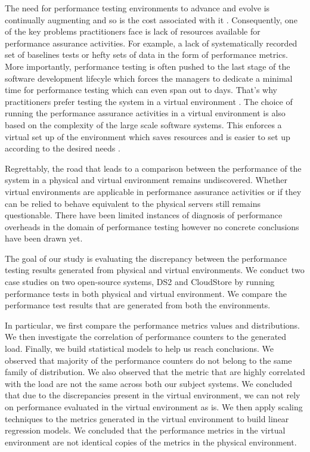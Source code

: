 The need for performance testing environments to advance and evolve is continually augmenting and so is the cost associated with it \cite{stpmag} \cite{bertolino2007software}. Consequently, one of the key problems practitioners face is lack of resources available for performance assurance activities\cite{5306331}. For example, a lack of systematically recorded set of baselines tests or hefty sets of data in the form of performance metrics. More importantly, performance testing is often pushed to the last stage of the software development lifecyle which forces the managers to dedicate a minimal time for performance testing which can even span out to days. That's why practitioners prefer testing the system in a virtual environment \cite{whyvirtualisbetter}\cite{vmwarehighcost}. The choice of running the performance assurance activities in a virtual environment is also based on the complexity of the large scale software systems. This enforces a virtual set up of the environment which saves resources and is easier to set up according to the desired needs \cite{VMWarePowerCLIBlog}\cite{seetharaman2006test}. 

Regrettably, the road that leads to a comparison between the performance of the system in a physical and virtual environment remains undiscovered. Whether virtual environments are applicable in performance assurance activities or if they can be relied to behave equivalent to the physical servers still remains questionable. There have been limited instances of diagnosis of performance overheads \cite{menon2005diagnosing} in the domain of performance testing however no concrete conclusions have been drawn yet. 

The goal of our study is evaluating the discrepancy between the performance testing results generated from physical and virtual environments. 
We conduct two case studies on two open-source systems, DS2\cite{delldvd} and CloudStore \cite{cloudstore} by running performance tests in both physical and virtual environment. We compare the performance test results that are generated from both the environments.

In particular, we first compare the performance metrics values and distributions. We then investigate the correlation of performance counters to the generated load. Finally, we build statistical models to help us reach conclusions. 
We observed that majority of the performance counters do not belong to the same family of distribution. We also observed that the metric that are highly correlated with the load are not the same across both our subject systems.
We concluded that due to the discrepancies present in the virtual environment, we can not rely on performance evaluated in the virtual environment as is. We then apply scaling techniques to the metrics generated in the virtual environment to build linear regression models. We concluded that the performance metrics in the virtual environment are not identical copies of the metrics in the physical environment. 


